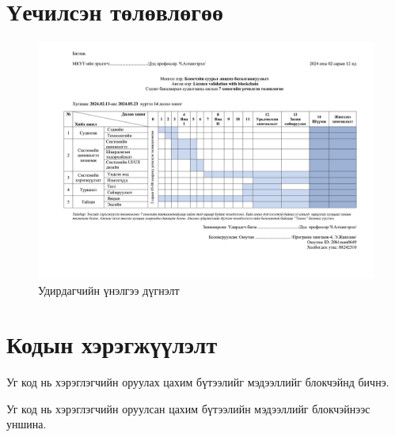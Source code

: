 \appendix
{}

\chapter{Үечилсэн төлөвлөгөө}
\begin{figure}[h!]
   \centering
   \includegraphics[scale=0.065, angle=90]{src/images/periodic-plan.png}
   \caption{Удирдагчийн үнэлгээ дүгнэлт}
\end{figure}


\chapter{Кодын хэрэгжүүлэлт}


Уг код нь хэрэглэгчийн оруулах цахим бүтээлийг  мэдээллийг блокчэйнд бичнэ.



Уг код нь хэрэглэгчийн оруулсан цахим бүтээлийн мэдээллийг блокчэйнээс уншина.

